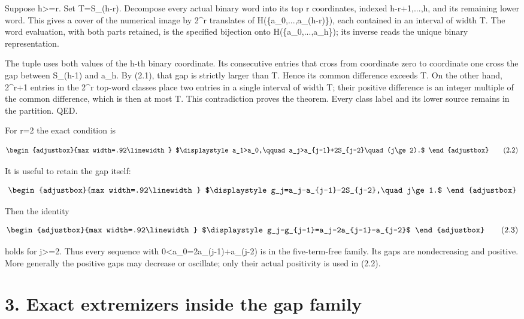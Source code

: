 Suppose h\textgreater=r. Set T=S\_(h-r). Decompose every actual binary word into its top r coordinates, indexed h-r+1,...,h, and its remaining lower word. This gives a cover of the numerical image by 2\^{}r translates of H(\{a\_0,...,a\_(h-r)\}), each contained in an interval of width T. The word evaluation, with both parts retained, is the specified bijection onto H(\{a\_0,...,a\_h\}); its inverse reads the unique binary representation.

The tuple uses both values of the h-th binary coordinate. Its consecutive entries that cross from coordinate zero to coordinate one cross the gap between S\_(h-1) and a\_h. By (2.1), that gap is strictly larger than T. Hence its common difference exceeds T. On the other hand, 2\^{}r+1 entries in the 2\^{}r top-word classes place two entries in a single interval of width T; their positive difference is an integer multiple of the common difference, which is then at most T. This contradiction proves the theorem. Every class label and its lower source remains in the partition. QED.

For r=2 the exact condition is

\[
\begin{adjustbox}{max width=.92\linewidth}
$\displaystyle a_1>a_0,\qquad
 a_j>a_{j-1}+2S_{j-2}\quad(j\ge2).$
\end{adjustbox}
\tag{2.2}
\]

It is useful to retain the gap itself:

\[
\begin{adjustbox}{max width=.92\linewidth}
$\displaystyle g_j=a_j-a_{j-1}-2S_{j-2},\quad j\ge1.$
\end{adjustbox}
\]

Then the identity

\[
\begin{adjustbox}{max width=.92\linewidth}
$\displaystyle g_j-g_{j-1}=a_j-2a_{j-1}-a_{j-2}$
\end{adjustbox}
\tag{2.3}
\]

holds for j\textgreater=2. Thus every sequence with 0\textless a\_0=2a\_(j-1)+a\_(j-2) is in the five-term-free family. Its gaps are nondecreasing and positive. More generally the positive gaps may decrease or oscillate; only their actual positivity is used in (2.2).

\section{3. Exact extremizers inside the gap family}\label{n14-exact-extremizers-inside-the-gap-family}

